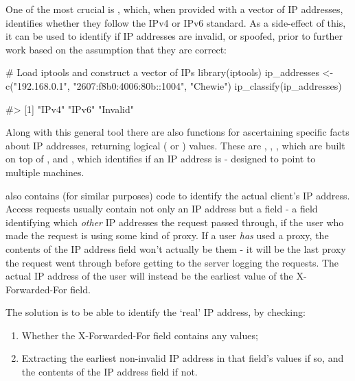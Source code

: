 One of the most crucial is , which, when provided
with a vector of IP addresses, identifies whether they follow the IPv4
or IPv6 standard. As a side-effect of this, it can be used to identify
if IP addresses are invalid, or spoofed, prior to further work based on
the assumption that they are correct:

\begin{Schunk}
\begin{Sinput}
# Load iptools and construct a vector of IPs
library(iptools)
ip_addresses <- c("192.168.0.1", "2607:f8b0:4006:80b::1004", "Chewie")
ip_classify(ip_addresses)
\end{Sinput}
\begin{Soutput}
#> [1] "IPv4"    "IPv6"    "Invalid"
\end{Soutput}
\end{Schunk}

Along with this general tool there are also functions for ascertaining
specific facts about IP addresses, returning logical ( or
) values. These are , ,
, which are built on top of , and
, which identifies if an IP address is
 - designed to point to multiple machines.

 also contains (for similar purposes) code to identify the
actual client's IP address. Access requests usually contain not only an
IP address but a  field - a field identifying which
\emph{other} IP addresses the request passed through, if the user who
made the request is using some kind of proxy. If a user \emph{has} used
a proxy, the contents of the IP address field won't actually be them -
it will be the last proxy the request went through before getting to the
server logging the requests. The actual IP address of the user will
instead be the earliest value of the X-Forwarded-For field.

The solution is to be able to identify the `real' IP address, by
checking:

\begin{enumerate}
\def\labelenumi{\arabic{enumi}.}
\tightlist
\item
  Whether the X-Forwarded-For field contains any values;
\item
  Extracting the earliest non-invalid IP address in that field's values
  if so, and the contents of the IP address field if not.
\end{enumerate}

